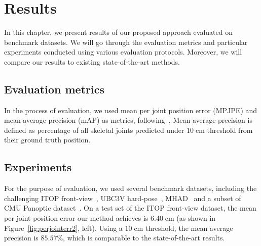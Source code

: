 \chapter{Results}\label{chap:results}

In this chapter, we present results of our proposed approach evaluated on benchmark datasets. We will go through the evaluation metrics and particular experiments conducted using various evaluation protocols. Moreover, we will compare our results to existing state-of-the-art methods.\par

\section{Evaluation metrics}
In the process of evaluation, we used mean per joint position error (MPJPE) and mean average precision (mAP) as metrics, following~\cite{Ali19,haque2016viewpoint,Marin18jvcir,Shafaei16}. Mean average precision is defined as percentage of all skeletal joints predicted under $10 \; \mbox{cm}$ threshold from their ground truth position.\par

\section{Experiments}



For the purpose of evaluation, we used several benchmark datasets, including the challenging ITOP front-view~\cite{haque2016viewpoint}, UBC3V hard-pose~\cite{Shafaei16}, MHAD~\cite{Vidal:2013:BMC:2478277.2478412} and a subset of CMU Panoptic dataset~\cite{Joo_2017_TPAMI}. On a test set of the ITOP front-view dataset, the mean per joint position error our method achieves is $6.40 \; \mbox{cm}$ (as shown in Figure~\ref{fig:perjointerr2}, left). Using a $10 \; \mbox{cm}$ threshold, the mean average precision is $85.57\%$, which is comparable to the state-of-the-art results.\par %
\vspace{5mm}

